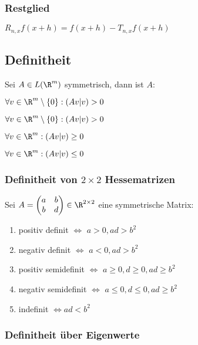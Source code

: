 \subsubsection*{Restglied}

$R_{n,x} f(x+h) = f(x+h) - T_{n,x}f(x+h)$

\subsection*{Definitheit}

Sei $A \in L(\R^m)$ symmetrisch, dann ist $A$:

\begin{description}[leftmargin=!,labelwidth=28mm]
	\item[positiv definit]     $\forall v \in \R^m \setminus \{0\} : (Av|v) > 0$
	\item[negativ definit]     $\forall v \in \R^m \setminus \{0\} : (Av|v) > 0$
	\item[positiv semidefinit] $\forall v \in \R^m : (Av|v) \geq 0$
	\item[negativ semidefinit] $\forall v \in \R^m : (Av|v) \leq 0$
\end{description}

\subsubsection*{Definitheit von $2\times 2$ Hessematrizen}

Sei $A = \begin{pmatrix} a & b \\ b & d \end{pmatrix} \in \R^{2 \times 2}$ eine symmetrische Matrix:

\begin{enumerate}[label=(\alph*)]
	\item positiv definit $\Leftrightarrow$ $a > 0, ad > b^2$
	\item negativ definit $\Leftrightarrow$ $a < 0, ad > b^2$
	\item positiv semidefinit $\Leftrightarrow$ $a \geq 0, d \geq 0, ad \geq b^2$
	\item negativ semidefinit $\Leftrightarrow$ $a \leq 0, d \leq 0, ad \geq b^2$
	\item indefinit $\Leftrightarrow ad < b^2$
\end{enumerate}

\subsubsection*{Definitheit über Eigenwerte}


